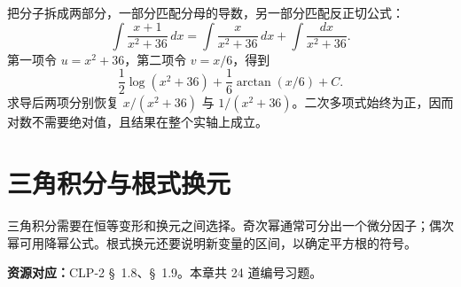 \documentclass[UTF8,12pt,a4paper,fontset=fandol]{ctexart}
\begin{document}
\begin{solve}\label{ans:c13q24}
把分子拆成两部分，一部分匹配分母的导数，另一部分匹配反正切公式：
\[
\int\frac{x+1}{x^2+36}\,dx=\int\frac{x}{x^2+36}\,dx+\int\frac{dx}{x^2+36}.
\]
第一项令 $u=x^2+36$，第二项令 $v=x/6$，得到
\[
\frac12\log(x^2+36)+\frac{1}{6}\arctan(x/6)+C.
\]
求导后两项分别恢复 $x/(x^2+36)$ 与 $1/(x^2+36)$。二次多项式始终为正，因而对数不需要绝对值，且结果在整个实轴上成立。
\end{solve}

\clearpage
\section{三角积分与根式换元}\label{sec:ch14}
三角积分需要在恒等变形和换元之间选择。奇次幂通常可分出一个微分因子；偶次幂可用降幂公式。根式换元还要说明新变量的区间，以确定平方根的符号。

\textbf{资源对应：}CLP-2 \S~1.8、\S~1.9。本章共 24 道编号习题。
\end{document}
